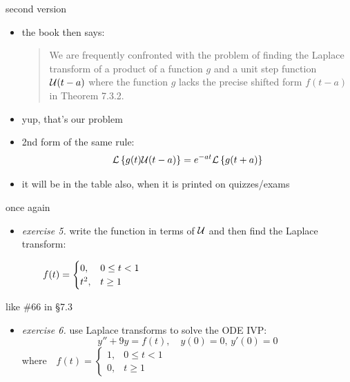\documentclass[dvipsnames,colorlinks]{beamer}
\begin{document}
\begin{frame}{second version}

\begin{itemize}
\item the book then says:

\small
\begin{quote}
We are frequently confronted with the problem of finding the Laplace transform of a product of a function $g$ and a unit step function $\mathcal{U}(t-a)$ where the function $g$ lacks the precise shifted form $f(t-a)$ in Theorem 7.3.2.
\end{quote}
\normalsize
\item yup, that's our problem
\item 2nd form of the same rule:
    $$\mathcal{L}\left\{g(t)\mathcal{U}(t-a)\right\} = e^{-at} \mathcal{L}\left\{g(t+a)\right\}$$
\item it will be in the table also, when it is printed on quizzes/exams
\end{itemize}
\end{frame}


\begin{frame}{once again}

\begin{itemize}
\item \emph{exercise 5.}  write the function in terms of $\mathcal{U}$ and then find the Laplace transform:

\vspace{-3mm}
    $$f(t) = \begin{cases} 0, & 0 \le t < 1 \\ t^2, & t\ge 1 \end{cases} \hspace{70mm}$$

\vspace{55mm}
\end{itemize}
\end{frame}


\begin{frame}{like \#66 in \S7.3}

\begin{itemize}
\item \emph{exercise 6.}  use Laplace transforms to solve the ODE IVP:
    $$y''+9y=f(t), \quad y(0)=0, \, y'(0)=0$$
where \,\, $\displaystyle f(t) = \begin{cases} 1, & 0 \le t < 1 \\ 0, & t\ge 1 \end{cases}$

\vspace{55mm}
\end{itemize}
\end{frame}
\end{document}
